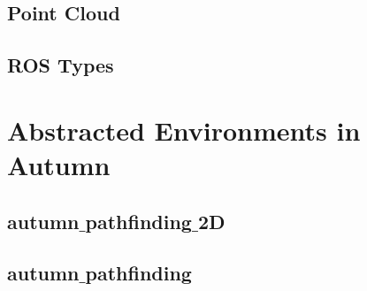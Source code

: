 \subsection{Point Cloud}

\subsection{ROS Types}

\section{Abstracted Environments in Autumn}

\subsection{autumn$\_$pathfinding$\_$2D}

\subsection{autumn$\_$pathfinding}
